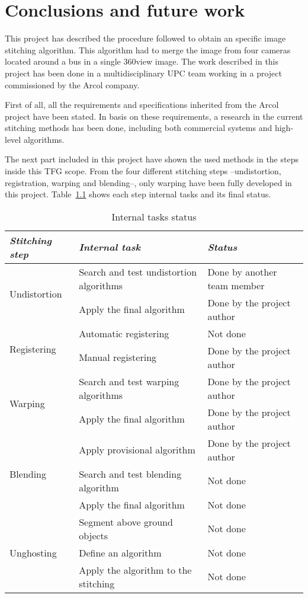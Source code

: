 \chapter{Conclusions and future work}

This project has described the procedure followed to obtain an specific image stitching algorithm. This algorithm had to merge the image from four cameras located around a bus in a single 360\degree view image. The work described in this project has been done in a multidisciplinary UPC team working in a project commissioned by the Arcol company.

First of all, all the requirements and specifications inherited from the Arcol project have been stated. In basis on these requirements, a research in the current stitching methods has been done, including both commercial systems and high-level algorithms.

The next part included in this project have shown the used methods in the steps inside this TFG scope. From the four different stitching steps --undistortion, registration, warping and blending--, only warping have been fully developed in this project. Table~\ref{table:mywork} shows each step internal tasks and its final status.

\begin{table}[H]
\begin{tabular}{l l l}

\emph{Stitching step} & \emph{Internal task} & \emph{Status} \\
\hline\hline
\multirow{2}{*}{Undistortion} &Search and test undistortion algorithms& Done by another team member\\
&Apply the final algorithm & Done by the project author \\
\hline
\multirow{2}{*}{Registering} &Automatic registering& Not done\\
&Manual registering&Done by the project author\\
\hline
\multirow{2}{*}{Warping} &Search and test warping algorithms&  Done by the project author \\
&Apply the final algorithm & Done by the project author \\
\hline
\multirow{3}{*}{Blending} &Apply provisional algorithm &Done by the project author \\
&Search and test blending algorithm& Not done\\
&Apply the final algorithm &Not done \\
\hline
\multirow{3}{*}{Unghosting} &Segment above ground objects &Not done \\
&Define an algorithm& Not done\\
&Apply the algorithm to the stitching &Not done \\
\hline
\end{tabular}
\caption{Internal tasks status}
\label{table:mywork}
\end{table}

